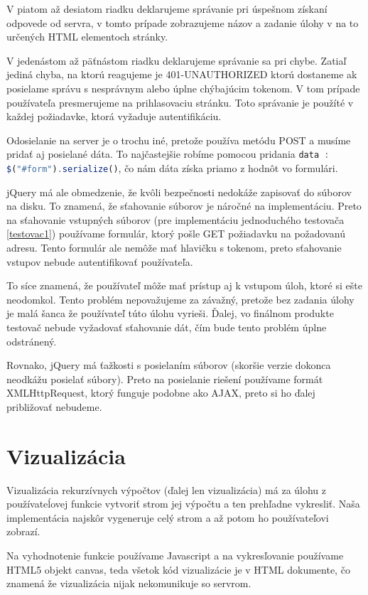 V piatom až desiatom riadku deklarujeme správanie pri úspešnom získaní odpovede
od servra, v tomto prípade zobrazujeme názov a zadanie úlohy v na to určených
HTML elementoch stránky.

V jedenástom až päťnástom riadku deklarujeme správanie sa pri chybe. Zatiaľ jediná
chyba, na ktorú reagujeme je 401-UNAUTHORIZED ktorú dostaneme ak posielame
správu s nesprávnym alebo úplne chýbajúcim tokenom. V tom prípade používateľa presmerujeme
na prihlasovaciu stránku. Toto správanie je použíté v každej požiadavke, ktorá
vyžaduje autentifikáciu.

Odosielanie na server je o trochu iné, pretože používa metódu POST a musíme pridať
aj posielané dáta. To najčastejšie robíme pomocou pridania \newline
\lstinline[language=Javascript]{data : $("#form").serialize()}, čo nám dáta
získa priamo z hodnôt vo formulári.

jQuery má ale obmedzenie, že kvôli bezpečnosti nedokáže zapisovať do súborov na disku.
To znamená, že sťahovanie súborov je náročné na implementáciu. Preto na sťahovanie
vstupných súborov (pre implementáciu jednoduchého testovača \ref{testovac1}) používame
formulár, ktorý pošle GET požiadavku na požadovanú adresu. Tento formulár ale nemôže mať
hlavičku s tokenom, preto sťahovanie vstupov nebude autentifikovať používateľa.

To síce znamená, že používateľ môže mať prístup aj k vstupom úloh, ktoré si ešte neodomkol.
Tento problém nepovažujeme za závažný, pretože bez zadania úlohy je malá šanca že používateľ
túto úlohu vyrieši. Ďalej, vo finálnom produkte testovač nebude vyžadovať sťahovanie
dát, čím bude tento problém úplne odstránený.

Rovnako, jQuery má ťažkosti s posielaním súborov (skoršie verzie dokonca neodkážu
posielať súbory). Preto na posielanie riešení používame formát XMLHttpRequest, ktorý
funguje podobne ako AJAX, preto si ho ďalej približovať nebudeme.

\section{Vizualizácia}
Vizualizácia rekurzívnych výpočtov (ďalej len vizualizácia) má za úlohu z používateĺovej
funkcie vytvoriť strom jej výpočtu a ten prehľadne vykresliť. Naša implementácia
najskôr vygeneruje celý strom a až potom ho používateľovi zobrazí.

Na vyhodnotenie funkcie používame Javascript a na vykresľovanie používame HTML5 objekt canvas,
teda všetok kód vizualizácie je v HTML dokumente, čo znamená že vizualizácia nijak nekomunikuje so servrom.

